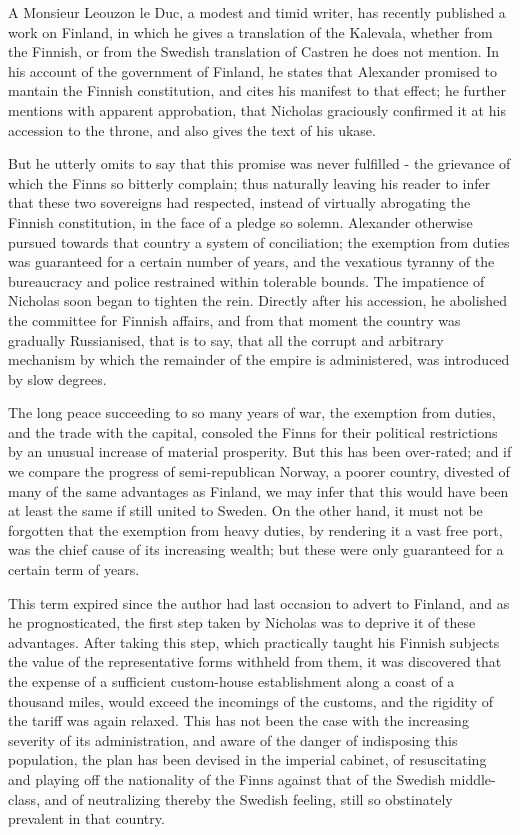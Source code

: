 \documentclass[11pt,a4paper]{article}
\begin{document}
A Monsieur Leouzon le Duc, a modest and timid writer, has recently published a work on Finland, in which he gives a translation of the Kalevala, whether from the Finnish, or from the Swedish translation of Castren he does not mention. In his account of the government of Finland, he states that Alexander promised to mantain the Finnish constitution, and cites his manifest to that effect; he further mentions with apparent approbation, that Nicholas graciously confirmed it at his accession to the throne, and also gives the text of his ukase.

But he utterly omits to say that this promise was never fulfilled - the grievance of which the Finns so bitterly complain; thus naturally leaving his reader to infer that these two sovereigns had respected, instead of virtually abrogating the Finnish constitution, in the face of a pledge so solemn. Alexander otherwise pursued towards that country a system of conciliation; the exemption from duties was guaranteed for a certain number of years, and the vexatious tyranny of the bureaucracy and police restrained within tolerable bounds. The impatience of Nicholas soon began to tighten the rein. Directly after his accession, he abolished the committee for Finnish affairs, and from that moment the country was gradually Russianised, that is to say, that all the corrupt and arbitrary mechanism by which the remainder of the empire is administered, was introduced by slow degrees.

The long peace succeeding to so many years of war, the exemption from duties, and the trade with the capital, consoled the Finns for their political restrictions by an unusual increase of material prosperity. But this has been over-rated; and if we compare the progress of semi-republican Norway, a poorer country, divested of many of the same advantages as Finland, we may infer that this would have been at least the same if still united to Sweden. On the other hand, it must not be forgotten that the exemption from heavy duties, by rendering it a vast free port, was the chief cause of its increasing wealth; but these were only guaranteed for a certain term of years.

This term expired since the author had last occasion to advert to Finland, and as he prognosticated, the first step taken by Nicholas was to deprive it of these advantages. After taking this step, which practically taught his Finnish subjects the value of the representative forms withheld from them, it was discovered that the expense of a sufficient custom-house establishment along a coast of a thousand miles, would exceed the incomings of the customs, and the rigidity of the tariff was again relaxed. This has not been the case with the increasing severity of its administration, and aware of the danger of indisposing this population, the plan has been devised in the imperial cabinet, of resuscitating and playing off the nationality of the Finns against that of the Swedish middle-class, and of neutralizing thereby the Swedish feeling, still so obstinately prevalent in that country.
\end{document}
